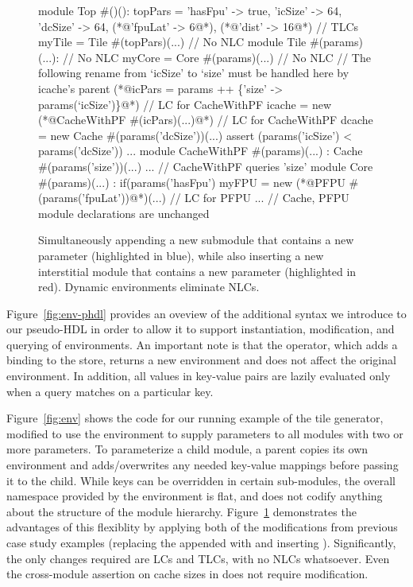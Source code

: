 \begin{figure}
\centering
\begin{phdl}
module Top #()():
  topPars = {'hasFpu' -> true, 'icSize' -> 64, 'dcSize' -> 64, (*@\textcolor[rgb]{0,0,1}{'fpuLat' -> 6}@*), (*@\textcolor[rgb]{1,0,0}{'dist' -> 16}@*) } // TLCs
  myTile = Tile #(topPars)(...)                                  // No NLC
module Tile #(params)(...):                                      // No NLC
  myCore = Core #(params)(...)                                   // No NLC
  // The following rename from `icSize' to `size' must be handled here by icache's parent
  (*@\textcolor[rgb]{1,0,0}{icPars = params ++ \{'size' -> params(`icSize')\}}@*)                // LC for CacheWithPF
  icache = new (*@\textcolor[rgb]{1,0,0}{CacheWithPF \#(icPars)(...)}@*)                        // LC for CacheWithPF
  dcache = new Cache #(params('dcSize'))(...)
  assert (params('icSize') < params('dcSize')) ...
module CacheWithPF #(params)(...) :
  Cache #(params('size'))(...) ... // CacheWithPF queries 'size'
module Core #(params)(...) :
   if(params('hasFpu') myFPU = new (*@\textcolor[rgb]{0,0,1}{PFPU \#(params('fpuLat'))}@*)(...) // LC for PFPU
... // Cache, PFPU module declarations are unchanged
\end{phdl} 
\caption{Simultaneously appending a new submodule that contains a new parameter (highlighted in blue), while also inserting
a new interstitial module that contains a new parameter (highlighted in red). Dynamic environments eliminate NLCs.}
\label{fig:env-delta}
\end{figure}
Figure~\ref{fig:env-phdl} provides an oveview of the additional syntax we introduce to our pseudo-HDL in order to allow it to support instantiation, modification, and querying of environments.
An important note is that the \code{++} operator, which adds a binding to the store, returns a new environment and does not affect the original environment.
In addition, all values in key-value pairs are lazily evaluated only when a query matches on a particular key.

Figure~\ref{fig:env} shows the code for our running example of the tile generator, modified to use the environment to supply parameters to all modules with two or more parameters.
To parameterize a child module, a parent copies its own environment and adds/overwrites any needed key-value mappings before passing it to the child.
While keys can be overridden in certain sub-modules, the overall namespace provided by the environment is flat, and does not codify anything about the structure of the module hierarchy.
Figure~\ref{fig:env-delta} demonstrates the advantages of this flexiblity by applying both of the modifications from previous case study examples
(replacing the appended  with  and inserting ).
Significantly, the only changes required are LCs and TLCs, with no NLCs whatsoever.
Even the cross-module assertion on cache sizes in  does not require modification.

